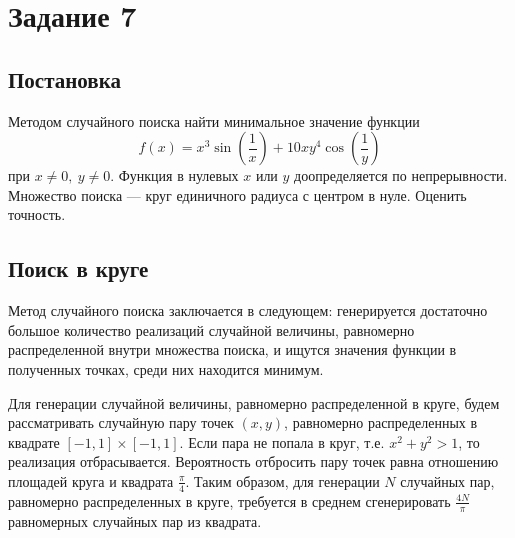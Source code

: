 \documentclass[12pt, a4paper]{article}
\begin{document}
\section*{Задание 7}
\subsection*{Постановка}
	Методом случайного поиска найти минимальное значение функции 
	\[ f(x)= x^3\sin\left( \frac 1{x} \right) + 10xy^4\cos\left( \frac 1 {y} \right) \]
	при $x\neq 0,\ y\neq 0$. Функция в нулевых $x$ или $y$ доопределяется по непрерывности.
	Множество поиска --- круг единичного радиуса с центром в нуле. Оценить точность.
\subsection*{Поиск в круге}
Метод случайного поиска заключается в следующем: генерируется достаточно большое количество реализаций случайной величины, равномерно распределенной внутри множества поиска, и ищутся значения функции в полученных точках, среди них находится минимум.

Для генерации случайной величины, равномерно распределенной в круге, будем рассматривать случайную пару точек $(x,y)$, равномерно распределенных в квадрате $[-1,1]\times [-1,1]$. Если пара не попала в круг, т.е. $x^2+y^2>1$, то реализация отбрасывается. Вероятность отбросить пару точек равна отношению площадей круга и квадрата $\frac{\pi}{4}$. Таким образом, для генерации $N$ случайных пар, равномерно распределенных в круге, требуется в среднем сгенерировать $\frac{4N}{\pi}$ равномерных случайных пар из квадрата. 
\end{document}
